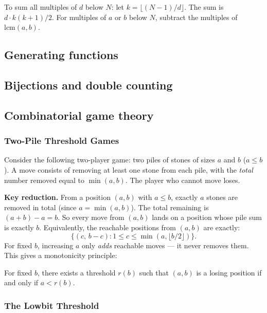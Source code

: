 \begin{remark}
To sum all multiples of $d$ below $N$: let $k = \lfloor (N-1)/d \rfloor$. The sum is $d \cdot k(k+1)/2$. For multiples of $a$ or $b$ below $N$, subtract the multiples of $\text{lcm}(a,b)$.
\end{remark}

\subsection{Generating functions}


\subsection{Bijections and double counting}


\subsection{Combinatorial game theory}

\subsubsection*{Two-Pile Threshold Games}

Consider the following two-player game: two piles of stones of sizes $a$ and $b$ ($a \le b$). A move consists of removing at least one stone from each pile, with the \emph{total} number removed equal to $\min(a,b)$. The player who cannot move loses.

\textbf{Key reduction.} From a position $(a,b)$ with $a \le b$, exactly $a$ stones are removed in total (since $a = \min(a,b)$). The total remaining is $(a+b)-a = b$. So every move from $(a,b)$ lands on a position whose pile sum is exactly $b$. Equivalently, the reachable positions from $(a,b)$ are exactly:
\[
\{(c,\, b-c) : 1 \le c \le \min(a, \lfloor b/2 \rfloor)\}.
\]
For fixed $b$, increasing $a$ only \emph{adds} reachable moves — it never removes them. This gives a monotonicity principle:

\begin{theorem}
For fixed $b$, there exists a threshold $r(b)$ such that $(a,b)$ is a losing position if and only if $a < r(b)$.
\end{theorem}

\subsubsection*{The Lowbit Threshold}

